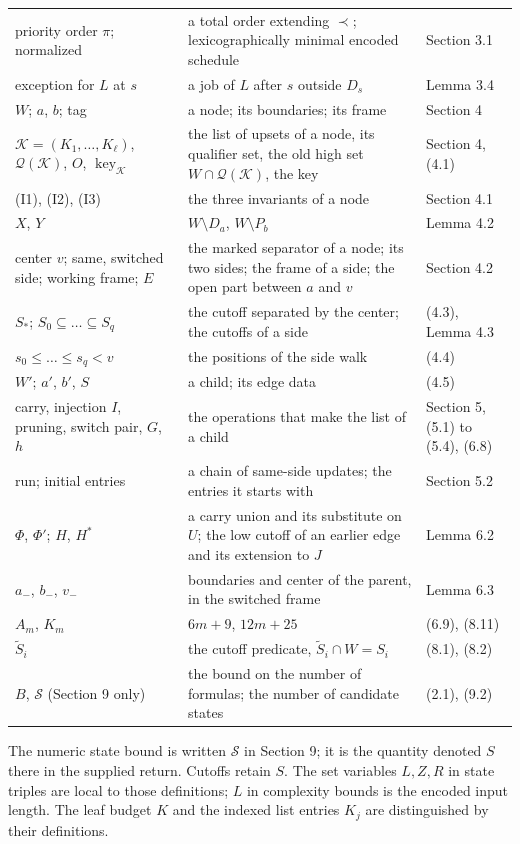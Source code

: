 \documentclass[11pt,a4paper]{article}
\theoremstyle{plain}
\theoremstyle{definition}
\begin{document}
{\begin{longtable}{@{}L{4.0cm}L{8.2cm}L{2.5cm}@{}}
priority order $\pi$; normalized & a total order extending $\prec$; lexicographically minimal encoded schedule & Section 3.1 \\
exception for $L$ at $s$ & a job of $L$ after $s$ outside $D_s$ & Lemma 3.4 \\
$W$; $a$, $b$; tag & a node; its boundaries; its frame & Section 4 \\
$\mathcal K=(K_1,\dots,K_\ell)$, $\mathcal Q(\mathcal K)$, $O$, $\operatorname{key}_{\mathcal K}$ & the list of upsets of a node, its qualifier set, the old high set $W\cap\mathcal Q(\mathcal K)$, the key & Section 4, (4.1) \\
(I1), (I2), (I3) & the three invariants of a node & Section 4.1 \\
$X$, $Y$ & $W\setminus D_a$, $W\setminus P_b$ & Lemma 4.2 \\
center $v$; same, switched side; working frame; $E$ & the marked separator of a node; its two sides; the frame of a side; the open part between $a$ and $v$ & Section 4.2 \\
$S_*$; $S_0\subseteq\dots\subseteq S_q$ & the cutoff separated by the center; the cutoffs of a side & (4.3), Lemma 4.3 \\
$s_0\leq\dots\leq s_q<v$ & the positions of the side walk & (4.4) \\
$W'$; $a'$, $b'$, $S$ & a child; its edge data & (4.5) \\
carry, injection $I$, pruning, switch pair, $G$, $h$ & the operations that make the list of a child & Section 5, (5.1) to (5.4), (6.8) \\
run; initial entries & a chain of same-side updates; the entries it starts with & Section 5.2 \\
$\Phi$, $\Phi'$; $H$, $H^*$ & a carry union and its substitute on $U$; the low cutoff of an earlier edge and its extension to $J$ & Lemma 6.2 \\
$a_-$, $b_-$, $v_-$ & boundaries and center of the parent, in the switched frame & Lemma 6.3 \\
$A_m$, $K_m$ & $6m+9$, $12m+25$ & (6.9), (8.11) \\
$\widetilde S_i$ & the cutoff predicate, $\widetilde S_i\cap W=S_i$ & (8.1), (8.2) \\
$B$, $\mathcal{S}$ (Section 9 only) & the bound on the number of formulas; the number of candidate states & (2.1), (9.2) \\
\end{longtable}}

\noindent The numeric state bound is written $\mathcal{S}$ in Section 9; it is the quantity denoted $S$ there in the supplied return. Cutoffs retain $S$. The set variables $L,Z,R$ in state triples are local to those definitions; $L$ in complexity bounds is the encoded input length. The leaf budget $K$ and the indexed list entries $K_j$ are distinguished by their definitions.
\end{document}
